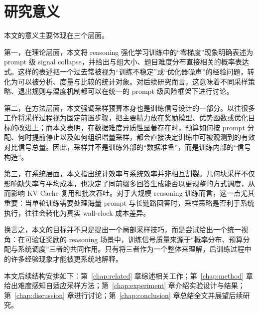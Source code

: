 \section{研究意义}

本文的意义主要体现在三个层面。

第一，在理论层面，本文将 reasoning 强化学习训练中的“零梯度”现象明确表述为 prompt 级 signal collapse，并给出与组大小、题目难度分布直接相关的概率表达式。这样的表述把一个过去常被视为“训练不稳定”或“优化器噪声”的经验问题，转化为可以被分析、度量与比较的统计对象。对后续研究而言，这意味着不同采样策略、退出规则与温度机制都可以在统一的 prompt 级风险框架下进行讨论。

第二，在方法层面，本文强调采样预算本身也是训练信号设计的一部分。以往很多工作将采样过程视为固定前置步骤，把主要精力放在奖励模型、优势函数或优化目标的改进上；而本文表明，在数据难度异质性显著存在时，预算如何按 prompt 分配、何时提前停止以及如何组织增量采样，都会直接决定训练中可被观测到的有效对比信号总量。因此，采样并不是训练外部的“数据准备”，而是训练内部的“信号构造”。

第三，在系统层面，本文指出统计效率与系统效率并非相互割裂。几何块采样不仅影响缺失率与平均成本，也决定了同前缀多回答生成能否以更规整的方式调度，从而影响 KV Cache 复用和批次吞吐。对于大规模 reasoning 训练而言，这一点尤其重要：当单轮训练需要处理海量 prompt 与长链路回答时，采样策略是否利于系统执行，往往会转化为真实 wall-clock 成本差异。

换言之，本文的目标并不只是提出一个局部采样技巧，而是尝试给出一个统一视角：在可验证奖励的 reasoning 场景中，训练信号质量来源于“概率分布、预算分配与系统调度”三者的共同作用。只有将三者作为一个整体来理解，后训练过程中的许多经验现象才能被更系统地解释。

本文后续结构安排如下：第~\ref{chap:related} 章综述相关工作；第~\ref{chap:method} 章给出难度感知自适应采样方法；第~\ref{chap:experiment} 章介绍实验设计与结果；第~\ref{chap:discussion} 章进行讨论；第~\ref{chap:conclusion} 章总结全文并展望后续研究。
